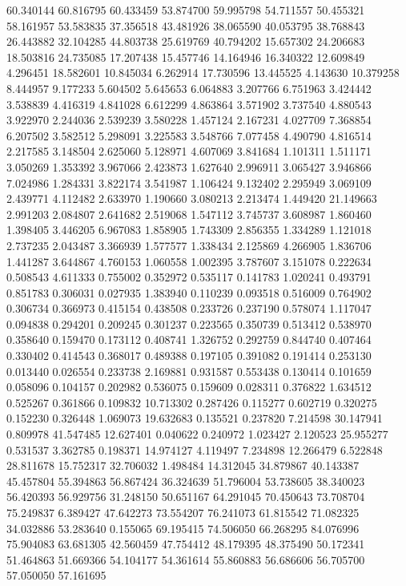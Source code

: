 60.340144
60.816795
60.433459
53.874700
59.995798
54.711557
50.455321
58.161957
53.583835
37.356518
43.481926
38.065590
40.053795
38.768843
26.443882
32.104285
44.803738
25.619769
40.794202
15.657302
24.206683
18.503816
24.735085
17.207438
15.457746
14.164946
16.340322
12.609849
4.296451
18.582601
10.845034
6.262914
17.730596
13.445525
4.143630
10.379258
8.444957
9.177233
5.604502
5.645653
6.064883
3.207766
6.751963
3.424442
3.538839
4.416319
4.841028
6.612299
4.863864
3.571902
3.737540
4.880543
3.922970
2.244036
2.539239
3.580228
1.457124
2.167231
4.027709
7.368854
6.207502
3.582512
5.298091
3.225583
3.548766
7.077458
4.490790
4.816514
2.217585
3.148504
2.625060
5.128971
4.607069
3.841684
1.101311
1.511171
3.050269
1.353392
3.967066
2.423873
1.627640
2.996911
3.065427
3.946866
7.024986
1.284331
3.822174
3.541987
1.106424
9.132402
2.295949
3.069109
2.439771
4.112482
2.633970
1.190660
3.080213
2.213474
1.449420
21.149663
2.991203
2.084807
2.641682
2.519068
1.547112
3.745737
3.608987
1.860460
1.398405
3.446205
6.967083
1.858905
1.743309
2.856355
1.334289
1.121018
2.737235
2.043487
3.366939
1.577577
1.338434
2.125869
4.266905
1.836706
1.441287
3.644867
4.760153
1.060558
1.002395
3.787607
3.151078
0.222634
0.508543
4.611333
0.755002
0.352972
0.535117
0.141783
1.020241
0.493791
0.851783
0.306031
0.027935
1.383940
0.110239
0.093518
0.516009
0.764902
0.306734
0.366973
0.415154
0.438508
0.233726
0.237190
0.578074
1.117047
0.094838
0.294201
0.209245
0.301237
0.223565
0.350739
0.513412
0.538970
0.358640
0.159470
0.173112
0.408741
1.326752
0.292759
0.844740
0.407464
0.330402
0.414543
0.368017
0.489388
0.197105
0.391082
0.191414
0.253130
0.013440
0.026554
0.233738
2.169881
0.931587
0.553438
0.130414
0.101659
0.058096
0.104157
0.202982
0.536075
0.159609
0.028311
0.376822
1.634512
0.525267
0.361866
0.109832
10.713302
0.287426
0.115277
0.602719
0.320275
0.152230
0.326448
1.069073
19.632683
0.135521
0.237820
7.214598
30.147941
0.809978
41.547485
12.627401
0.040622
0.240972
1.023427
2.120523
25.955277
0.531537
3.362785
0.198371
14.974127
4.119497
7.234898
12.266479
6.522848
28.811678
15.752317
32.706032
1.498484
14.312045
34.879867
40.143387
45.457804
55.394863
56.867424
36.324639
51.796004
53.738605
38.340023
56.420393
56.929756
31.248150
50.651167
64.291045
70.450643
73.708704
75.249837
6.389427
47.642273
73.554207
76.241073
61.815542
71.082325
34.032886
53.283640
0.155065
69.195415
74.506050
66.268295
84.076996
75.904083
63.681305
42.560459
47.754412
48.179395
48.375490
50.172341
51.464863
51.669366
54.104177
54.361614
55.860883
56.686606
56.705700
57.050050
57.161695
